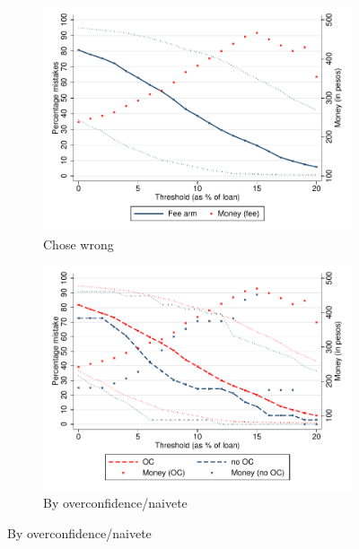 \documentclass[11pt]{article}
\begin{document}
\begin{figure}[H]
    \caption{Choice of contracts and treatment effects}
    \label{choose_wrong}
    \begin{center}
        \begin{subfigure}{0.45\textwidth}
        \caption{Chose wrong}
        \centering
        \includegraphics[width=\textwidth]{Figuras/line_cw_fc_te_cf.pdf}
        
    \end{subfigure}
        \begin{subfigure}{0.45\textwidth}
        \caption{By overconfidence/naivete}
        \centering
        \includegraphics[width=\textwidth]{Figuras/line_cw_fc_te_cf_OC_fee.pdf}

    \bigskip
        

\end{subfigure}
\end{center}
\end{figure}
\end{document}
